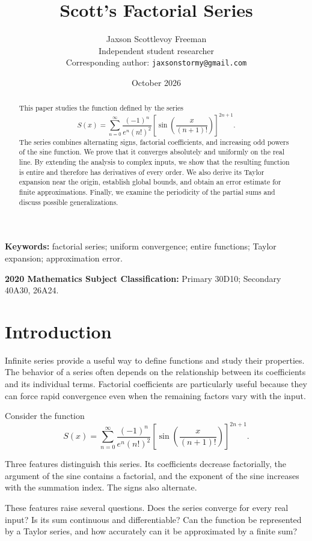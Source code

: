 \documentclass[12pt]{article}
\title{\textbf{Scott's Factorial Series}}
\author{Jaxson Scottlevoy Freeman\\
\small Independent student researcher\\
\small Corresponding author: \texttt{jaxsonstormy@gmail.com}}
\date{October 2026}
\theoremstyle{definition}
\theoremstyle{remark}
\begin{document}
\maketitle

\begin{abstract}
This paper studies the function defined by the series
\[
S(x)=
\sum_{n=0}^{\infty}
\frac{(-1)^n}{e^n(n!)^2}
\left[
\sin\left(\frac{x}{(n+1)!}\right)
\right]^{2n+1}.
\]
The series combines alternating signs, factorial coefficients,
and increasing odd powers of the sine function. We prove that
it converges absolutely and uniformly on the real line. By
extending the analysis to complex inputs, we show that the
resulting function is entire and therefore has derivatives
of every order. We also derive its Taylor expansion near the
origin, establish global bounds, and obtain an error estimate
for finite approximations. Finally, we examine the periodicity
of the partial sums and discuss possible generalizations.
\end{abstract}

\noindent\textbf{Keywords:} factorial series; uniform convergence; entire functions; Taylor expansion; approximation error.

\medskip
\noindent\textbf{2020 Mathematics Subject Classification:} Primary 30D10; Secondary 40A30, 26A24.

\section{Introduction}

Infinite series provide a useful way to define functions and
study their properties. The behavior of a series often depends
on the relationship between its coefficients and its individual
terms. Factorial coefficients are particularly useful because
they can force rapid convergence even when the remaining
factors vary with the input.

Consider the function
\[
S(x)=
\sum_{n=0}^{\infty}
\frac{(-1)^n}{e^n(n!)^2}
\left[
\sin\left(\frac{x}{(n+1)!}\right)
\right]^{2n+1}.
\]

Three features distinguish this series. Its coefficients
decrease factorially, the argument of the sine contains a
factorial, and the exponent of the sine increases with the
summation index. The signs also alternate.

These features raise several questions. Does the series
converge for every real input? Is its sum continuous and
differentiable? Can the function be represented by a Taylor
series, and how accurately can it be approximated by a finite
sum?
\end{document}
